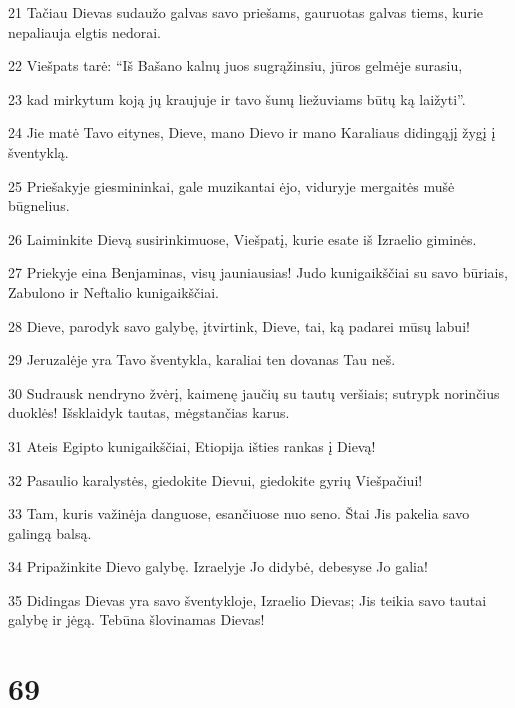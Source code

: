 \par 21 Tačiau Dievas sudaužo galvas savo priešams, gauruotas galvas tiems, kurie nepaliauja elgtis nedorai. 
\par 22 Viešpats tarė: “Iš Bašano kalnų juos sugrąžinsiu, jūros gelmėje surasiu, 
\par 23 kad mirkytum koją jų kraujuje ir tavo šunų liežuviams būtų ką laižyti”. 
\par 24 Jie matė Tavo eitynes, Dieve, mano Dievo ir mano Karaliaus didingąjį žygį į šventyklą. 
\par 25 Priešakyje giesmininkai, gale muzikantai ėjo, viduryje mergaitės mušė būgnelius. 
\par 26 Laiminkite Dievą susirinkimuose, Viešpatį, kurie esate iš Izraelio giminės. 
\par 27 Priekyje eina Benjaminas, visų jauniausias! Judo kunigaikščiai su savo būriais, Zabulono ir Neftalio kunigaikščiai. 
\par 28 Dieve, parodyk savo galybę, įtvirtink, Dieve, tai, ką padarei mūsų labui! 
\par 29 Jeruzalėje yra Tavo šventykla, karaliai ten dovanas Tau neš. 
\par 30 Sudrausk nendryno žvėrį, kaimenę jaučių su tautų veršiais; sutrypk norinčius duoklės! Išsklaidyk tautas, mėgstančias karus. 
\par 31 Ateis Egipto kunigaikščiai, Etiopija išties rankas į Dievą! 
\par 32 Pasaulio karalystės, giedokite Dievui, giedokite gyrių Viešpačiui! 
\par 33 Tam, kuris važinėja danguose, esančiuose nuo seno. Štai Jis pakelia savo galingą balsą. 
\par 34 Pripažinkite Dievo galybę. Izraelyje Jo didybė, debesyse Jo galia! 
\par 35 Didingas Dievas yra savo šventykloje, Izraelio Dievas; Jis teikia savo tautai galybę ir jėgą. Tebūna šlovinamas Dievas!



\chapter{69}


